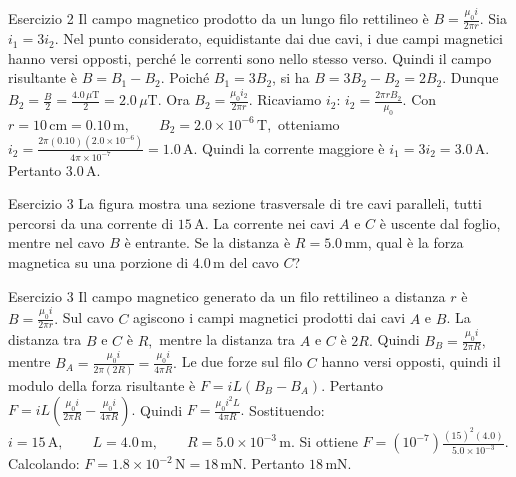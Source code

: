 \documentclass[a4paper]{article}
\begin{document}
\begin{snippetsolution}{Esercizio 2}
    Il campo magnetico prodotto da un lungo filo rettilineo è
    \(B = \frac{\mu_0 i}{2\pi r}.\)
    Sia
    \(i_1 = 3i_2.\)
    Nel punto considerato, equidistante dai due cavi, i due campi magnetici
    hanno versi opposti, perché le correnti sono nello stesso verso.
    Quindi il campo risultante è
    \(B = B_1 - B_2.\)
    Poiché \(B_1 = 3B_2\), si ha
    \(B = 3B_2 - B_2 = 2B_2.\)
    Dunque
    \(B_2 = \frac{B}{2} = \frac{4.0\,\mu\mathrm{T}}{2} = 2.0\,\mu\mathrm{T}.\)
    Ora
    \(B_2 = \frac{\mu_0 i_2}{2\pi r}.\)
    Ricaviamo \(i_2\):
    \(i_2 = \frac{2\pi rB_2}{\mu_0}.\)
    Con
    \(r = 10\,\mathrm{cm} = 0.10\,\mathrm{m}, \qquad B_2 = 2.0 \times 10^{-6}\,\mathrm{T},\)
    otteniamo
    \(i_2 = \frac{ 2\pi(0.10)(2.0 \times 10^{-6}) }{ 4\pi \times 10^{-7} } = 1.0\,\mathrm{A}.\)
    Quindi la corrente maggiore è
    \(i_1 = 3i_2 = 3.0\,\mathrm{A}.\)
    Pertanto
    \(\boxed{3.0\,\mathrm{A}}.\)
\end{snippetsolution}
\begin{snippetexercise}{Esercizio 3}
    La figura mostra una sezione trasversale di tre cavi paralleli, tutti
    percorsi da una corrente di \(15\,\mathrm{A}\). La corrente nei cavi
    \(A\) e \(C\) è uscente dal foglio, mentre nel cavo \(B\) è entrante.
    Se la distanza è \(R = 5.0\,\mathrm{mm}\), qual è la forza magnetica su
    una porzione di \(4.0\,\mathrm{m}\) del cavo \(C\)?

\end{snippetexercise}
\begin{snippetsolution}{Esercizio 3}
    Il campo magnetico generato da un filo rettilineo a distanza \(r\) è
    \(B = \frac{\mu_0 i}{2\pi r}.\)
    Sul cavo \(C\) agiscono i campi magnetici prodotti dai cavi \(A\) e \(B\).
    La distanza tra \(B\) e \(C\) è
    \(R,\)
    mentre la distanza tra \(A\) e \(C\) è
    \(2R.\)
    Quindi
    \(B_B = \frac{\mu_0 i}{2\pi R},\)
    mentre
    \(B_A = \frac{\mu_0 i}{2\pi(2R)} = \frac{\mu_0 i}{4\pi R}.\)
    Le due forze sul filo \(C\) hanno versi opposti, quindi il modulo della
    forza risultante è
    \(F = iL(B_B - B_A).\)
    Pertanto
    \(F = iL \left( \frac{\mu_0 i}{2\pi R} - \frac{\mu_0 i}{4\pi R} \right).\)
    Quindi
    \(F = \frac{\mu_0 i^2L}{4\pi R}.\)
    Sostituendo:
    \(i = 15\,\mathrm{A}, \qquad L = 4.0\,\mathrm{m}, \qquad R = 5.0 \times 10^{-3}\,\mathrm{m}.\)
    Si ottiene
    \(F = \left(10^{-7}\right) \frac{(15)^2(4.0)}{5.0 \times 10^{-3}}.\)
    Calcolando:
    \(F = 1.8 \times 10^{-2}\,\mathrm{N} = 18\,\mathrm{mN}.\)
    Pertanto
    \(\boxed{18\,\mathrm{mN}}.\)
\end{snippetsolution}
\end{document}
